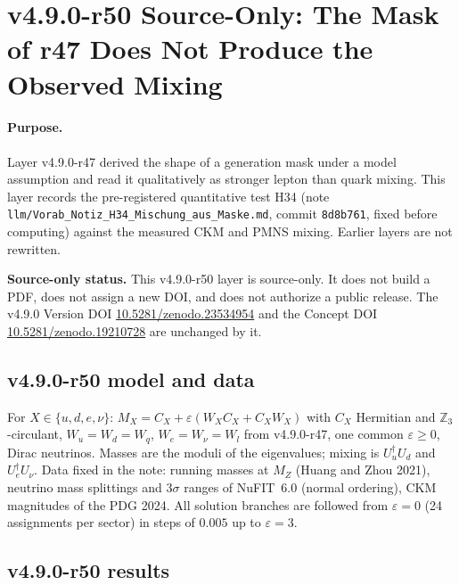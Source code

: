 \clearpage
\section*{v4.9.0-r50 Source-Only: The Mask of r47 Does Not Produce the Observed Mixing}
\label{sec:v490-r50-mixing-test}

\paragraph{Purpose.}
Layer v4.9.0-r47 derived the shape of a generation mask under a model assumption and read it qualitatively as stronger lepton than quark
mixing.  This layer records the pre-registered quantitative test H34 (note \texttt{llm/Vorab\_Notiz\_H34\_Mischung\_aus\_Maske.md}, commit
\texttt{8d8b761}, fixed before computing) against the measured CKM and PMNS mixing.  Earlier layers are not rewritten.

\noindent\textbf{Source-only status.}
This v4.9.0-r50 layer is source-only.  It does not build a PDF, does not assign a new DOI,
and does not authorize a public release.  The v4.9.0 Version DOI
\href{https://doi.org/10.5281/zenodo.23534954}{10.5281/zenodo.23534954} and the Concept DOI
\href{https://doi.org/10.5281/zenodo.19210728}{10.5281/zenodo.19210728} are unchanged by it.

\subsection*{v4.9.0-r50 model and data}
\label{subsec:v490-r50-model}

For \(X\in\{u,d,e,\nu\}\): \(M_X=C_X+\varepsilon(W_XC_X+C_XW_X)\) with \(C_X\) Hermitian and \(\mathbb Z_3\)-circulant, \(W_u=W_d=W_q\),
\(W_e=W_\nu=W_l\) from v4.9.0-r47, one common \(\varepsilon\ge0\), Dirac neutrinos.  Masses are the moduli of the eigenvalues; mixing is
\(U_u^\dagger U_d\) and \(U_e^\dagger U_\nu\).  Data fixed in the note: running masses at \(M_Z\) (Huang and Zhou 2021), neutrino
mass splittings and \(3\sigma\) ranges of NuFIT~6.0 (normal ordering), CKM magnitudes of the PDG 2024.  All solution branches are followed
from \(\varepsilon=0\) (24 assignments per sector) in steps of \(0.005\) up to \(\varepsilon=3\).

\subsection*{v4.9.0-r50 results}
\label{subsec:v490-r50-results}

